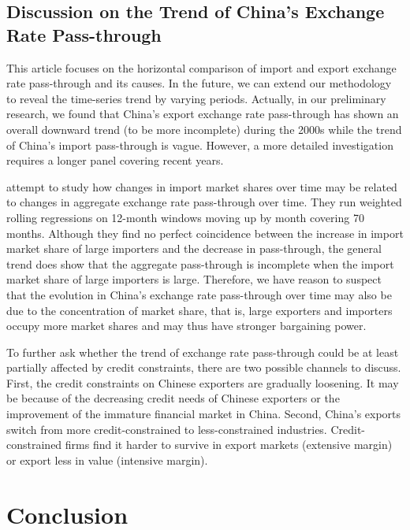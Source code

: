 \documentclass[12pt]{article}
\begin{document}
\subsection{Discussion on the Trend of China’s Exchange Rate Pass-through}

This article focuses on the horizontal comparison of import and export exchange rate pass-through and its causes. In the future, we can extend our methodology to reveal the time-series trend by varying periods. Actually, in our preliminary research, we found that China's export exchange rate pass-through has shown an overall downward trend (to be more incomplete) during the 2000s while the trend of China's import pass-through is vague. However, a more detailed investigation requires a longer panel covering recent years.

\cite{devereux2017} attempt to study how changes in import market shares over time may be related to changes in aggregate exchange rate pass-through over time. They run weighted rolling regressions on 12-month windows moving up by month covering 70 months. Although they find no perfect coincidence between the increase in import market share of large importers and the decrease in pass-through, the general trend does show that the aggregate pass-through is incomplete when the import market share of large importers is large. Therefore, we have reason to suspect that the evolution in China's exchange rate pass-through over time may also be due to the concentration of market share, that is, large exporters and importers occupy more market shares and may thus have stronger bargaining power.

To further ask whether the trend of exchange rate pass-through could be at least partially affected by credit constraints, there are two possible channels to discuss. First, the credit constraints on Chinese exporters are gradually loosening. It may be because of the decreasing credit needs of Chinese exporters or the improvement of the immature financial market in China. Second, China's exports switch from more credit-constrained to less-constrained industries. Credit-constrained firms find it harder to survive in export markets (extensive margin) or export less in value (intensive margin).

\section{Conclusion}\label{sec-conclusion}
\end{document}
